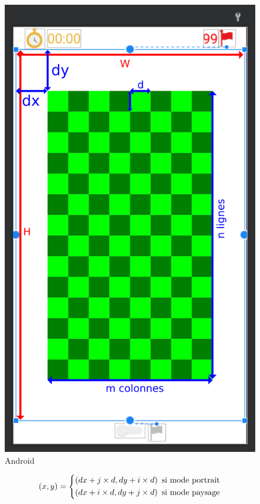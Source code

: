 \documentclass{beamer}
\begin{document}
\begin{frame}
\begin{columns}
        \begin{column}{0.4\linewidth}
            \begin{figure}[H]
                \centering
                \includegraphics[width=0.57\linewidth]{Ressources/androidPositions.png}
                \caption{Android}
            \end{figure}
            \tiny
            $$
                (x,y) = \begin{dcases}
                    \left( dx+j\times d, dy+i\times d\right) \text{ si mode portrait} \\
                    \left( dx+i\times d, dy+j\times d\right) \text{ si mode paysage}
                \end{dcases}
            $$
            
        \end{column}
    \end{columns}
    
    
    
\end{frame}
\end{document}

